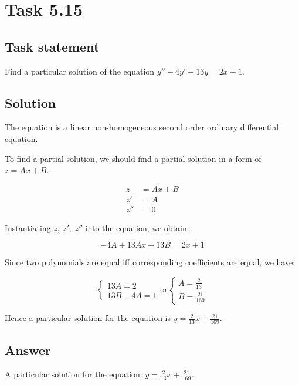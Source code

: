 \section*{Task 5.15}

\subsection*{Task statement}

Find a particular solution of the equation $y'' - 4y' + 13 y = 2x + 1$.

\subsection*{Solution}

The equation is a linear non-homogeneous second order ordinary differential equation.

To find a partial solution, we should find a partial solution in a form of $z = Ax + B$.

\begin{displaymath}
    \begin{aligned}
        z & = Ax + B \\
        z' & = A \\
        z'' & = 0
    \end{aligned}
\end{displaymath}

Instantiating $z,\ z',\ z''$ into the equation, we obtain:

\[-4A + 13Ax + 13B = 2x + 1\]

Since two polynomials are equal iff corresponding coefficients are equal, we have:

\begin{displaymath}
    \begin{cases}
        13A = 2 \\
        13B - 4A = 1
    \end{cases}
    \text{or}
    \begin{cases}
        A = \frac{2}{13} \\
        B = \frac{21}{169}
    \end{cases}
\end{displaymath}

Hence a particular solution for the equation is $y = \frac{2}{13}x + \frac{21}{169}$.

\subsection*{Answer}

A particular solution for the equation: $y = \frac{2}{13}x + \frac{21}{169}$.
